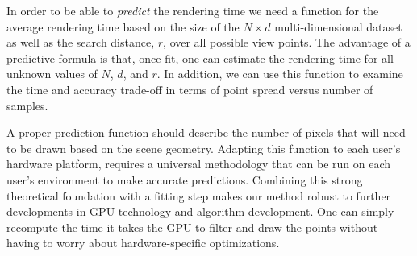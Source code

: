 In order to be able to \emph{predict} the rendering time we need a
function for the average rendering time based on the size of the $N \times d$
multi-dimensional dataset as well as the search distance, $r$, over all possible view
points.  The advantage
of a predictive formula is that, once fit, one can estimate the rendering time
for all unknown values of $N$, $d$, and $r$.
In addition, we can use this function to examine the time and accuracy
trade-off in terms of point spread versus number of samples.

A proper prediction function should describe the number
of pixels that will need to be drawn based on the scene geometry.
Adapting this function
to each user's
hardware platform, requires a universal methodology that can be run on
each user's environment to make accurate predictions.
Combining this strong theoretical foundation with a fitting step makes our
method robust to further developments in GPU technology and algorithm 
development. One can simply recompute the time it takes the GPU to filter and
draw the points without having to worry about hardware-specific optimizations.

